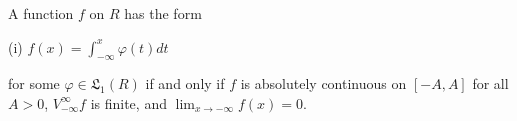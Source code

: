 A function $f$ on $R$ has the form

(i) $f(x) = \int_{-\infty}^{x} \varphi(t) dt$

for some $\varphi \in \mathfrak{L}_1(R)$ if and only if $f$ is absolutely continuous on $[-A, A]$ for all $A > 0$, $V_{-\infty}^{\infty}f$ is finite, and $\lim_{x \to -\infty} f(x) = 0$.